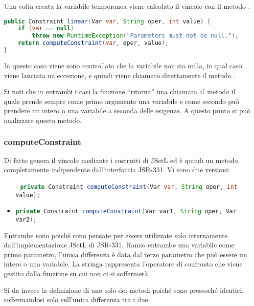 Una volta creata la variabile temporanea  viene calcolato il
vincolo con il metodo .

\begin{lstlisting}[language = Java,
                   caption = {\files{linear}, con variabile singola.}]
public Constraint linear(Var var, String oper, int value) {
	if (var == null)
		throw new RuntimeException("Parameters must not be null.");
	return computeConstraint(var, oper, value);
}
\end{lstlisting}
In questo caso viene sono controllato che la variabile  non sia
nulla, in qual caso viene lanciata un'eccezione, e quindi viene chiamato 
direttamente il metodo .

Si noti che in entrambi i casi la funzione ``ritorna'' una chiamata al metodo
 il quale prende sempre come primo argomento
una variabile e come secondo può prendere un intero o una variabile a seconda
delle esigenze. A questo punto si può analizzare questo metodo.
 
\subsubsection{computeConstraint}
Di fatto  genera il vincolo mediante i costrutti
di JSetL ed è quindi un metodo completamente indipendente dall'interfaccia
JSR-331. Vi sono due versioni:
\begin{itemize}
\item[-]\lstinline[language=Java]$private Constraint computeConstraint(Var var, String oper, int value);$
\item[-]\lstinline[language=Java]$private Constraint computeConstraint(Var var1, String oper, Var var2);$
\end{itemize}
Entrambe sono  poiché sono pensate per essere utilizzate solo
internamente dall'implementazione JSetL di JSR-331. Hanno entrambe una variabile
come primo parametro, l'unica differenza è data dal terzo parametro che 
può essere un intero o una variabile. La stringa  rappresenta
l'operatore di confronto che viene gestito dalla funzione 
su cui non ci si soffermerà.

Si da invece la definizione di uno solo dei metodi poiché sono pressoché 
identici, soffermandosi solo sull'unica differenza tra i due:

